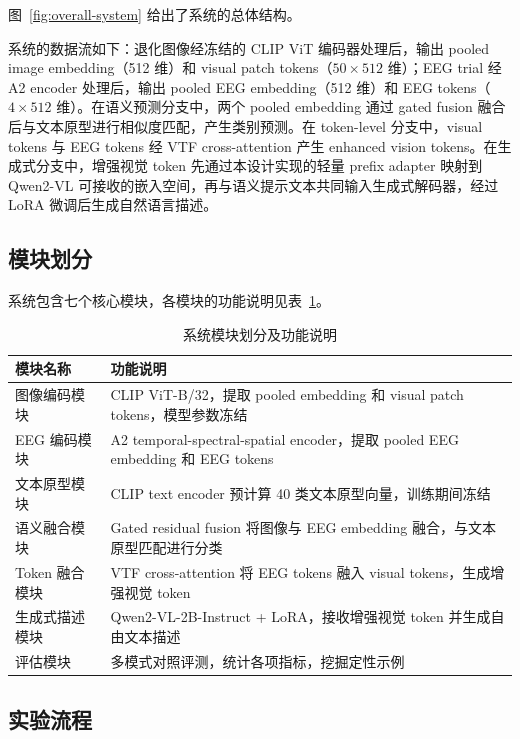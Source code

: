 图~\ref{fig:overall-system} 给出了系统的总体结构。


系统的数据流如下：退化图像经冻结的 CLIP ViT 编码器处理后，输出 pooled image embedding（512 维）和 visual patch tokens（$50\times512$ 维）；EEG trial 经 A2 encoder 处理后，输出 pooled EEG embedding（512 维）和 EEG tokens（$4\times512$ 维）。在语义预测分支中，两个 pooled embedding 通过 gated fusion 融合后与文本原型进行相似度匹配，产生类别预测。在 token-level 分支中，visual tokens 与 EEG tokens 经 VTF cross-attention 产生 enhanced vision tokens。在生成式分支中，增强视觉 token 先通过本设计实现的轻量 prefix adapter 映射到 Qwen2-VL 可接收的嵌入空间，再与语义提示文本共同输入生成式解码器，经过 LoRA 微调后生成自然语言描述。

\subsection{模块划分}

系统包含七个核心模块，各模块的功能说明见表~\ref{tab:modules}。

\begin{table}[htbp]
  \centering
  \caption{系统模块划分及功能说明}
  \label{tab:modules}
  \begin{tabularx}{\linewidth}{l X}
    \toprule
    模块名称 & 功能说明 \\
    \midrule
    图像编码模块 & CLIP ViT-B/32，提取 pooled embedding 和 visual patch tokens，模型参数冻结 \\
    EEG 编码模块 & A2 temporal-spectral-spatial encoder，提取 pooled EEG embedding 和 EEG tokens \\
    文本原型模块 & CLIP text encoder 预计算 40 类文本原型向量，训练期间冻结 \\
    语义融合模块 & Gated residual fusion 将图像与 EEG embedding 融合，与文本原型匹配进行分类 \\
    Token 融合模块 & VTF cross-attention 将 EEG tokens 融入 visual tokens，生成增强视觉 token \\
    生成式描述模块 & Qwen2-VL-2B-Instruct + LoRA，接收增强视觉 token 并生成自由文本描述 \\
    评估模块 & 多模式对照评测，统计各项指标，挖掘定性示例 \\
    \bottomrule
  \end{tabularx}
\end{table}

\subsection{实验流程}

